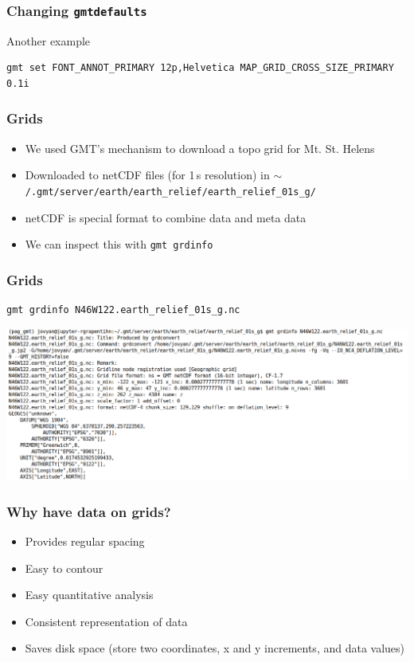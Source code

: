 \documentclass[unknownkeysallowed]{beamer}
\begin{document}
\begin{frame}[fragile=singleslide]
\frametitle{Changing {\tt gmtdefaults}}
Another example
{\scriptsize
\begin{verbatim}
gmt set FONT_ANNOT_PRIMARY 12p,Helvetica MAP_GRID_CROSS_SIZE_PRIMARY 0.1i 
\end{verbatim}		
}
\end{frame}

\begin{frame}
\frametitle{Grids}
	\begin{itemize}
		\item We used GMT's mechanism to download a topo grid for Mt. St. Helens 
		\item Downloaded to netCDF files (for 1\,s resolution) in {\scriptsize {\tt $\sim$/.gmt/server/earth/earth\_relief/earth\_relief\_01s\_g/}}
		\item netCDF is special format to combine data and meta data
		\item We can inspect this with {\tt gmt grdinfo}
	\end{itemize}
\end{frame}

\begin{frame}[fragile=singleslide]
\frametitle{Grids}
\begin{verbatim}
gmt grdinfo N46W122.earth_relief_01s_g.nc
\end{verbatim}
	\begin{center}
		\includegraphics[width=\textwidth]{../figures/gmt_grdinfo_example.png}	
	\end{center}

\end{frame}

\begin{frame}
\frametitle{Why have data on grids?}
	\begin{itemize}
		\item Provides regular spacing
		\item Easy to contour
		\item Easy quantitative analysis
		\item Consistent representation of data
		\item Saves disk space (store two coordinates, x and y increments, and data values)
	\end{itemize}
\end{frame}
\end{document}
